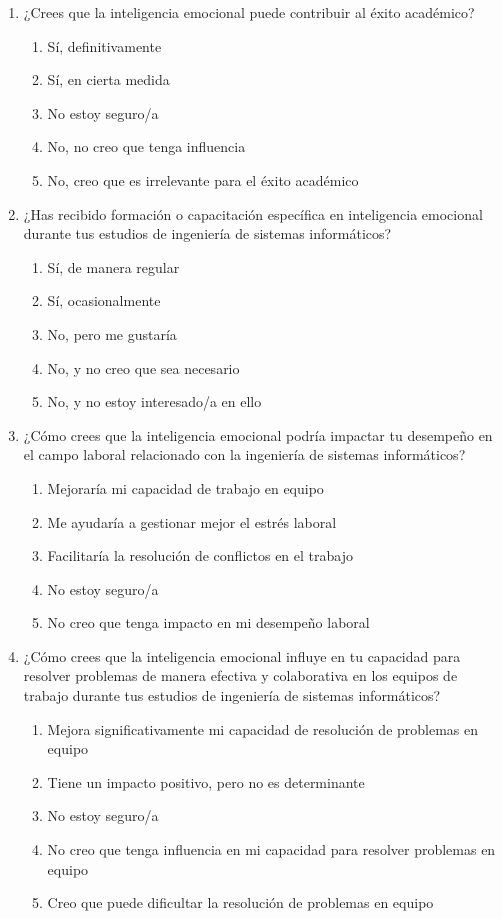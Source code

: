 \documentclass[journal]{IEEEtran}
\begin{document}
\begin{enumerate}
	\item ¿Crees que la inteligencia emocional puede contribuir al éxito académico?
	\begin{enumerate}
		\item Sí, definitivamente
		\item Sí, en cierta medida
		\item No estoy seguro/a
		\item No, no creo que tenga influencia
		\item No, creo que es irrelevante para el éxito académico
	\end{enumerate}
	
	\item ¿Has recibido formación o capacitación específica en inteligencia emocional durante tus estudios de ingeniería de sistemas informáticos?
	\begin{enumerate}
		\item Sí, de manera regular
		\item Sí, ocasionalmente
		\item No, pero me gustaría
		\item No, y no creo que sea necesario
		\item No, y no estoy interesado/a en ello
	\end{enumerate}
	
	\item ¿Cómo crees que la inteligencia emocional podría impactar tu desempeño en el campo laboral relacionado con la ingeniería de sistemas informáticos?
	\begin{enumerate}
		\item Mejoraría mi capacidad de trabajo en equipo
		\item Me ayudaría a gestionar mejor el estrés laboral
		\item Facilitaría la resolución de conflictos en el trabajo
		\item No estoy seguro/a
		\item No creo que tenga impacto en mi desempeño laboral
	\end{enumerate}
	
	\item ¿Cómo crees que la inteligencia emocional influye en tu capacidad para resolver problemas de manera efectiva y colaborativa en los equipos de trabajo durante tus estudios de ingeniería de sistemas informáticos?
	\begin{enumerate}
		\item Mejora significativamente mi capacidad de resolución de problemas en equipo
		\item Tiene un impacto positivo, pero no es determinante
		\item No estoy seguro/a
		\item No creo que tenga influencia en mi capacidad para resolver problemas en equipo
		\item Creo que puede dificultar la resolución de problemas en equipo
	\end{enumerate}
	

\end{enumerate}
\end{document}
